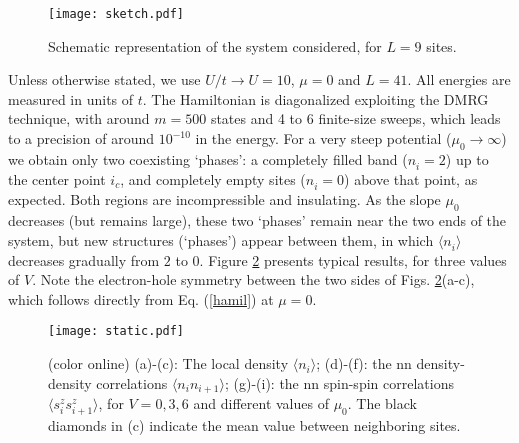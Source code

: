 \documentclass[aps,prl,showpacs,twocolumn,superscriptaddress]{revtex4-2}
\begin{document}

\begin{figure}[h!]
\texttt{[image: sketch.pdf]}
\caption{Schematic representation of the system considered, for $L=9$ sites.}
\label{system}
\end{figure}


\vspace{0.2cm}

 Unless otherwise stated,  we use $U/t\rightarrow U=10$, $\mu=0$ and $L=41$. All energies are measured in units of $t$.
The Hamiltonian is diagonalized exploiting   the
DMRG technique, with around $m=500$ states and 4 to 6 finite-size sweeps, which leads to a precision of around $10^{-10}$ in the energy. For a very steep potential ($\mu^{}_0\rightarrow\infty$) we obtain only two coexisting `phases': a completely filled band ($n^{}_i=2$) up to the center point $i^{}_c$, and completely empty sites ($n^{}_i=0$) above that point, as expected. Both regions are incompressible and insulating. As the slope $\mu^{}_0$ decreases (but remains large), these two `phases' remain near the two ends of the system, but new structures (`phases') appear between them, in which $\langle n^{}_i\rangle$ decreases gradually from $2$ to $0$. Figure \ref{static} presents typical results, for three values of $V$.
Note the electron-hole symmetry between the two sides of Figs. \ref{static}(a-c), which follows directly from Eq. (\ref{hamil}) at $\mu=0$.





\begin{figure}
\texttt{[image: static.pdf]}
\caption{(color online) (a)-(c): The local  density $\langle n_i\rangle$; (d)-(f): the nn density-density correlations $\langle n_in_{i+1}\rangle$;  (g)-(i):  the nn spin-spin correlations $\langle s^z_is^z_{i+1}\rangle$, for $V=0,3,6$ and different values of $\mu_0$. The black diamonds in (c) indicate the mean value between neighboring sites. }
\label{static}
\end{figure}



\end{document}
